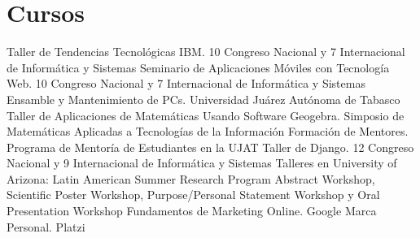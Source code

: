 \documentclass[]{friggeri-cv}
\begin{document}
\section{Cursos}
\begin{entrylist}
          {Taller de Tendencias Tecnológicas IBM.}
          { 10 Congreso Nacional y 7 Internacional de Informática y Sistemas}
          {}
          {Seminario de Aplicaciones Móviles con Tecnología Web.}
          {10 Congreso Nacional y 7 Internacional de Informática y Sistemas}
          {}
          {Ensamble y Mantenimiento de PCs.}
          {Universidad Juárez Autónoma de Tabasco}
          {}
          {Taller de Aplicaciones de Matemáticas Usando Software Geogebra. }
          { Simposio de Matemáticas Aplicadas a Tecnologías de la Información}
          {}
          {Formación de Mentores.}
          {Programa de Mentoría de Estudiantes en la UJAT}
          {}
          {Taller de Django.}
          {12 Congreso Nacional y 9 Internacional de Informática y Sistemas}
          {}
          {Talleres en University of Arizona:}
          {Latin American Summer Research Program}
          {Abstract Workshop, Scientific Poster Workshop, Purpose/Personal Statement Workshop y Oral Presentation Workshop}
          {Fundamentos de Marketing Online.}
          {Google}
          {}
          {Marca Personal.}
          {Platzi}
          {}
\end{entrylist}
\newline
\newline
\newline
\newline
\newline
\newline
\newline
\newline
\newline
\newline
\newline
\newline
\newline
\newline
\newline
\newline
\newline
\newline
\newline
\newline
\newline
\end{document}
